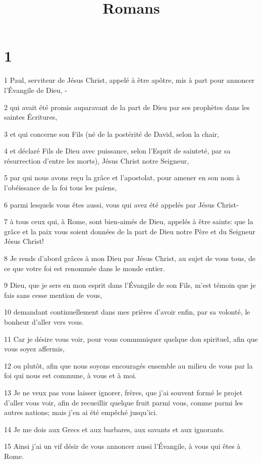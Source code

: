 

\title{Romans}


\chapter{1}

\par 1 Paul, serviteur de Jésus Christ, appelé à être apôtre, mis à part pour annoncer l'Évangile de Dieu, -
\par 2 qui avait été promis auparavant de la part de Dieu par ses prophètes dans les saintes Écritures,
\par 3 et qui concerne son Fils (né de la postérité de David, selon la chair,
\par 4 et déclaré Fils de Dieu avec puissance, selon l'Esprit de sainteté, par sa résurrection d'entre les morts), Jésus Christ notre Seigneur,
\par 5 par qui nous avons reçu la grâce et l'apostolat, pour amener en son nom à l'obéissance de la foi tous les païens,
\par 6 parmi lesquels vous êtes aussi, vous qui avez été appelés par Jésus Christ-
\par 7 à tous ceux qui, à Rome, sont bien-aimés de Dieu, appelés à être saints: que la grâce et la paix vous soient données de la part de Dieu notre Père et du Seigneur Jésus Christ!
\par 8 Je rends d'abord grâces à mon Dieu par Jésus Christ, au sujet de vous tous, de ce que votre foi est renommée dans le monde entier.
\par 9 Dieu, que je sers en mon esprit dans l'Évangile de son Fils, m'est témoin que je fais sans cesse mention de vous,
\par 10 demandant continuellement dans mes prières d'avoir enfin, par sa volonté, le bonheur d'aller vers vous.
\par 11 Car je désire vous voir, pour vous communiquer quelque don spirituel, afin que vous soyez affermis,
\par 12 ou plutôt, afin que nous soyons encouragés ensemble au milieu de vous par la foi qui nous est commune, à vous et à moi.
\par 13 Je ne veux pas vous laisser ignorer, frères, que j'ai souvent formé le projet d'aller vous voir, afin de recueillir quelque fruit parmi vous, comme parmi les autres nations; mais j'en ai été empêché jusqu'ici.
\par 14 Je me dois aux Grecs et aux barbares, aux savants et aux ignorants.
\par 15 Ainsi j'ai un vif désir de vous annoncer aussi l'Évangile, à vous qui êtes à Rome.
